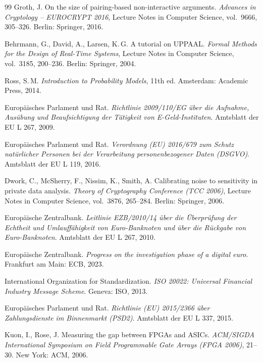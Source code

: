 ﻿\documentclass[a4paper,12pt]{article}
\theoremstyle{definition}
\begin{document}
\begin{thebibliography}{99}
  Groth, J.
  On the size of pairing-based non-interactive arguments.
  \emph{Advances in Cryptology -- EUROCRYPT 2016}, Lecture Notes in Computer
  Science, vol.\ 9666, 305--326. Berlin: Springer, 2016.

  Behrmann, G., David, A., Larsen, K.\,G.
  A tutorial on UPPAAL.
  \emph{Formal Methods for the Design of Real-Time Systems}, Lecture Notes in
  Computer Science, vol.\ 3185, 200--236. Berlin: Springer, 2004.

  Ross, S.\,M.
  \emph{Introduction to Probability Models}, 11th ed.
  Amsterdam: Academic Press, 2014.

  Europäisches Parlament und Rat.
  \emph{Richtlinie 2009/110/EG über die Aufnahme, Ausübung und Beaufsichtigung
  der Tätigkeit von E-Geld-Instituten}.
  Amtsblatt der EU L 267, 2009.

  Europäisches Parlament und Rat.
  \emph{Verordnung (EU) 2016/679 zum Schutz natürlicher Personen bei der
  Verarbeitung personenbezogener Daten (DSGVO)}.
  Amtsblatt der EU L 119, 2016.

  Dwork, C., McSherry, F., Nissim, K., Smith, A.
  Calibrating noise to sensitivity in private data analysis.
  \emph{Theory of Cryptography Conference (TCC 2006)}, Lecture Notes in Computer
  Science, vol.\ 3876, 265--284. Berlin: Springer, 2006.

  Europäische Zentralbank.
  \emph{Leitlinie EZB/2010/14 über die Überprüfung der Echtheit und Umlauffähigkeit
  von Euro-Banknoten und über die Rückgabe von Euro-Banknoten}.
  Amtsblatt der EU L 267, 2010.

  Europäische Zentralbank.
  \emph{Progress on the investigation phase of a digital euro}.
  Frankfurt am Main: ECB, 2023.

  International Organization for Standardization.
  \emph{ISO 20022: Universal Financial Industry Message Scheme}.
  Geneva: ISO, 2013.

  Europäisches Parlament und Rat.
  \emph{Richtlinie (EU) 2015/2366 über Zahlungsdienste im Binnenmarkt (PSD2)}.
  Amtsblatt der EU L 337, 2015.

  Kuon, I., Rose, J.
  Measuring the gap between FPGAs and ASICs.
  \emph{ACM/SIGDA International Symposium on Field Programmable Gate Arrays
  (FPGA 2006)}, 21--30. New York: ACM, 2006.


\end{thebibliography}
\end{document}
